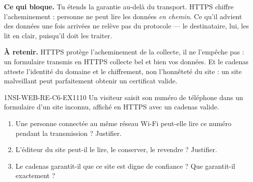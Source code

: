 

\textbf{Ce qui bloque.} Tu étends la garantie au-delà du transport. HTTPS chiffre
l'acheminement : personne ne peut lire les données \emph{en chemin}. Ce qu'il advient des
données une fois arrivées ne relève pas du protocole — le destinataire, lui, les lit en clair,
puisqu'il doit les traiter.

\textbf{À retenir.} HTTPS protège l'acheminement de la collecte, il ne l'empêche pas : un
formulaire transmis en HTTPS collecte bel et bien vos données. Et le cadenas atteste l'identité
du domaine et le chiffrement, non l'honnêteté du site : un site malveillant peut parfaitement
obtenir un certificat valide.

\begin{exercice}{1NSI-WEB-RE-C6-EX1}{1}{10}
Un visiteur saisit son numéro de téléphone dans un formulaire d'un site inconnu, affiché en
HTTPS avec un cadenas valide.
\begin{enumerate}
  \item Une personne connectée au même réseau Wi-Fi peut-elle lire ce numéro pendant la
        transmission ? Justifier.
  \item L'éditeur du site peut-il le lire, le conserver, le revendre ? Justifier.
  \item Le cadenas garantit-il que ce site est digne de confiance ? Que garantit-il exactement ?
\end{enumerate}
\end{exercice}

